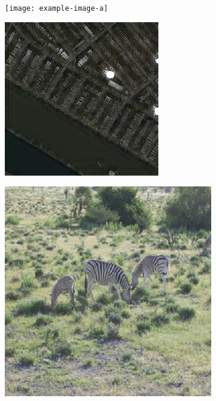 \begin{figure}
  \begin{subfigure}[t]{.2\textwidth}
    \centering
    \texttt{[image: example-image-a]}
  \end{subfigure}
  \begin{subfigure}[t]{.2\textwidth}
    \centering
    \includegraphics[width=\linewidth]{images/cycleGanResults/Satelite6Ld120_E100_Lr0002.jpg}
  \end{subfigure}
  \hfill
  \begin{subfigure}[t]{.2\textwidth}
    \centering
    \includegraphics[width=\linewidth]{images/cycleGanResults/zebra_input2.png}

\end{subfigure}
\end{figure}
